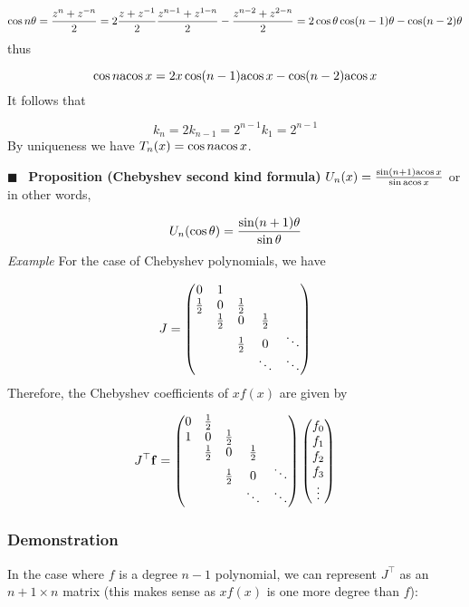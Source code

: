 \documentclass[12pt,landscape]{article}
\def\half{ {1 \over 2} }
\def\vc#1{ {\mathbf #1} }
\def\acos{ {\rm acos}\, }
\begin{document}
{\[
\cos n \theta = {z^n + z^{-n} \over 2} = 2 {z + z^{-1} \over 2} {z^{n-1} + z^{1-n} \over 2}- {z^{n-2} + z^{2-n} \over 2} =
2 \cos \theta \cos (n-1)\theta - \cos(n-2)\theta
\]
thus

\[
\cos n \acos x = 2 x \cos(n-1) \acos x - \cos(n-2) \acos x
\]
It follows that

\[
k_n = 2 k_{n-1} = 2^{n-1} k_1 = 2^{n-1}
\]
By uniqueness we have $T_n(x) = \cos n \acos x$.

\ensuremath{\blacksquare}
\
\textbf{Proposition (Chebyshev second kind formula)} $U_n(x) = {\sin (n+1) \acos x \over \sin \acos x}$ or in other words,

\[
U_n(\cos \theta) = {\sin (n+1) \theta \over \sin \theta}
\]
\newpage
\emph{Example} For the case of Chebyshev polynomials, we have

\[
J = \begin{pmatrix}
0 & 1 \cr
\half & 0 & \half \cr
& \half & 0 & \half \cr
&& \half & 0 & \ddots \cr
&&&\ddots & \ddots
\end{pmatrix}
\]
Therefore, the Chebyshev coefficients of $x f(x)$ are given by

\[
J^\top \vc f = \begin{pmatrix}
0 & \half \cr
1 & 0 & \half \cr
& \half & 0 & \half \cr
&& \half & 0 & \ddots \cr
&&&\ddots & \ddots
\end{pmatrix} \begin{pmatrix} f_0\\ f_1\\f_2\\f_3\\\vdots\end{pmatrix}
\]
\subsubsection{Demonstration}
In the case where $f$ is a degree $n-1$  polynomial, we can represent $J^\top$ as an $n+1 \times n$ matrix (this makes sense as $x f(x)$ is one more degree than $f$):


}
\end{document}
